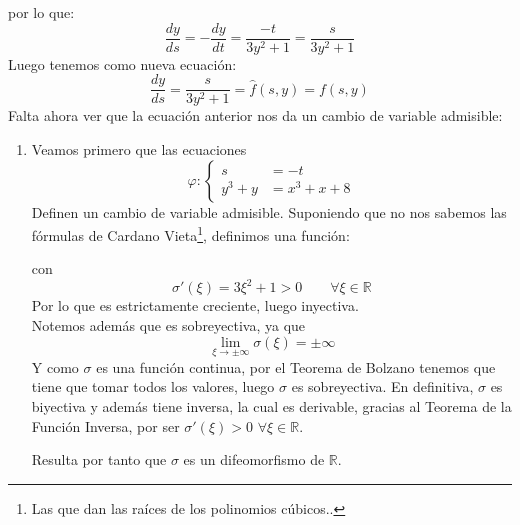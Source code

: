 \begin{ejemplo}
    por lo que:
    \begin{equation*}
        \dfrac{dy}{ds} = -\dfrac{dy}{dt} = \dfrac{-t}{3y^2 + 1} = \dfrac{s}{3y^2 + 1}
    \end{equation*}
    Luego tenemos como nueva ecuación:
    \begin{equation*}
        \dfrac{dy}{ds} = \dfrac{s}{3y^2 + 1} = \hat{f}(s,y) = f(s,y)
    \end{equation*}
    Falta ahora ver que la ecuación anterior nos da un cambio de variable admisible:
    \begin{enumerate}
        \item Veamos primero que las ecuaciones 
            \begin{equation*}
                \varphi: \left\{\begin{array}{rl}
                        s &= -t \\
                        y^3 + y &= x^3+x+8
                \end{array}\right.
            \end{equation*}
            Definen un cambio de variable admisible. Suponiendo que no nos sabemos las fórmulas de Cardano Vieta\footnote{Las que dan las raíces de los polinomios cúbicos..}, definimos una función:

            con 
            \begin{equation*}
                \sigma'(\xi) = 3\xi^2 + 1 > 0 \qquad \forall \xi \in \mathbb{R}
            \end{equation*}
            Por lo que es estrictamente creciente, luego inyectiva.\\

            Notemos además que es sobreyectiva, ya que
            \begin{equation*}
                \lim_{\xi\to\pm\infty}\sigma(\xi) = \pm \infty
            \end{equation*}
            Y como $\sigma$ es una función continua, por el Teorema de Bolzano tenemos que tiene que tomar todos los valores, luego $\sigma$ es sobreyectiva. En definitiva, $\sigma$ es biyectiva y además tiene inversa, la cual es derivable, gracias al Teorema de la Función Inversa, por ser $\sigma'(\xi)>0$ $\forall \xi \in \mathbb{R}$.

            Resulta por tanto que $\sigma$ es un difeomorfismo de $\mathbb{R}$.\\


\end{enumerate}
\end{ejemplo}
